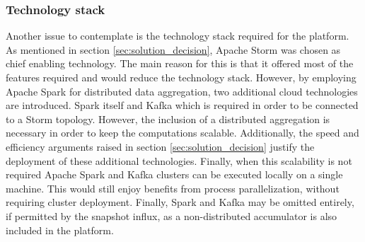 \subsubsection*{Technology stack}
Another issue to contemplate is the technology stack required for the platform. As mentioned in section \ref{sec:solution_decision}, Apache Storm was chosen as chief enabling technology. The main reason for this is that it offered most of the features required and would reduce the technology stack. However, by employing Apache Spark for distributed data aggregation, two additional cloud technologies are introduced. Spark itself and Kafka which is required in order to be connected to a Storm topology. However, the inclusion of a distributed aggregation is necessary in order to keep the computations scalable. Additionally, the speed and efficiency arguments raised in section \ref{sec:solution_decision} justify the deployment of these additional technologies. Finally, when this scalability is not required Apache Spark and Kafka clusters can be executed locally on a single machine. This would still enjoy benefits from process parallelization, without requiring cluster deployment. Finally, Spark and Kafka may be omitted entirely, if permitted by the snapshot influx, as a non-distributed accumulator is also included in the platform.




	







